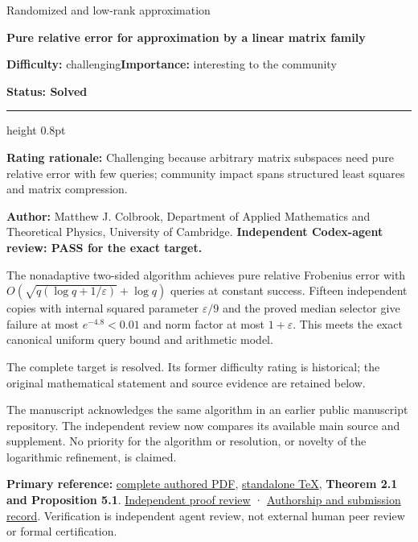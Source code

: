 \documentclass[11pt,a4paper]{article}
\makeatletter
\renewcommand{\subsection}{\Needspace{4\baselineskip}\@startsection{subsection}{2}{0pt}{9pt plus 1pt minus 1pt}{3pt}{\sffamily\bfseries\normalsize\color{ink}}}
\makeatother
\begin{document}
{\sffamily\small\color{muted}Randomized and low-rank approximation\par}
\vspace{3pt}
{\raggedright{}\sffamily\bfseries\fontsize{21}{24}\selectfont\color{ink}Pure
relative error for approximation by a linear matrix family\par}
\vspace{7pt}
{\sffamily\small\textbf{Difficulty:} challenging\quad\textbf{Importance:} interesting
to the community\par}
{\sffamily\small\bfseries\color{accent}Status: Solved\par}
\vspace{4pt}
{\color{accent}\hrule height 0.8pt}
\vspace{6pt}
\textbf{Rating rationale:} Challenging because arbitrary matrix
subspaces need pure relative error with few queries; community impact
spans structured least squares and matrix compression.

\subsection{Resolution --- 2026-09-11}\label{resolution-2026-09-11}

\textbf{Author:} Matthew J. Colbrook, Department of Applied Mathematics
and Theoretical Physics, University of Cambridge. \textbf{Independent
Codex-agent review: PASS for the exact target.}

The nonadaptive two-sided algorithm achieves pure relative Frobenius
error with \(O(\sqrt{q(\log q+1/\varepsilon)}+\log q)\) queries at
constant success. Fifteen independent copies with internal squared
parameter \(\varepsilon/9\) and the proved median selector give failure
at most \(e^{-4.8}<0.01\) and norm factor at most \(1+\varepsilon\).
This meets the exact canonical uniform query bound and arithmetic model.

The complete target is resolved. Its former difficulty rating is
historical; the original mathematical statement and source evidence are
retained below.

The manuscript acknowledges the same algorithm in an earlier public
manuscript repository. The independent review now compares its available
main source and supplement. No priority for the algorithm or resolution,
or novelty of the logarithmic refinement, is claimed.

\textbf{Primary reference:}
\href{https://github.com/ajt60gaibb/OpenProblemsInNLA/blob/main/references/colbrook-transfer-2026-09-11/manuscripts/05_linear_family_relative_sketch.pdf}{complete
authored PDF},
\href{https://github.com/ajt60gaibb/OpenProblemsInNLA/blob/main/references/colbrook-transfer-2026-09-11/manuscripts/05_linear_family_relative_sketch.tex}{standalone
TeX}, \textbf{Theorem 2.1 and Proposition 5.1}.
\href{https://github.com/ajt60gaibb/OpenProblemsInNLA/blob/main/references/colbrook-transfer-2026-09-11/verification/reviews/RE-05-review.md}{Independent
proof review} ·
\href{https://github.com/ajt60gaibb/OpenProblemsInNLA/blob/main/references/colbrook-transfer-2026-09-11/README.md}{Authorship
and submission record}. Verification is independent agent review, not
external human peer review or formal certification.
\end{document}
